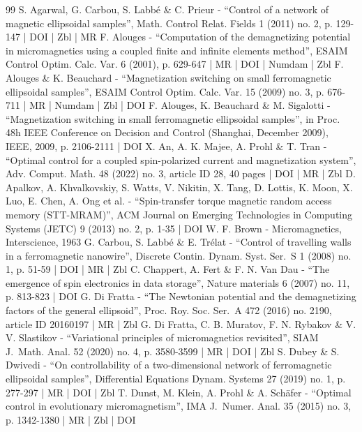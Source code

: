 \begin{thebibliography}{99}
S. Agarwal, G. Carbou, S. Labbé \& C. Prieur - “Control of a network of magnetic ellipsoidal samples”, Math. Control Relat. Fields 1 (2011) no. 2, p. 129-147 | DOI | Zbl | MR
F. Alouges - “Computation of the demagnetizing potential in micromagnetics using a coupled finite and infinite elements method”, ESAIM Control Optim. Calc. Var. 6 (2001), p. 629-647 | MR | DOI | Numdam | Zbl
F. Alouges \& K. Beauchard - “Magnetization switching on small ferromagnetic ellipsoidal samples”, ESAIM Control Optim. Calc. Var. 15 (2009) no. 3, p. 676-711 | MR | Numdam | Zbl | DOI
F. Alouges, K. Beauchard \& M. Sigalotti - “Magnetization switching in small ferromagnetic ellipsoidal samples”, in Proc. 48h IEEE Conference on Decision and Control (Shanghai, December 2009), IEEE, 2009, p. 2106-2111 | DOI
X. An, A. K. Majee, A. Prohl \& T. Tran - “Optimal control for a coupled spin-polarized current and magnetization system”, Adv. Comput. Math. 48 (2022) no. 3, article ID 28, 40 pages | DOI | MR | Zbl
D. Apalkov, A. Khvalkovskiy, S. Watts, V. Nikitin, X. Tang, D. Lottis, K. Moon, X. Luo, E. Chen, A. Ong et al. - “Spin-transfer torque magnetic random access memory (STT-MRAM)”, ACM Journal on Emerging Technologies in Computing Systems (JETC) 9 (2013) no. 2, p. 1-35 | DOI
W. F. Brown - Micromagnetics, Interscience, 1963
G. Carbou, S. Labbé \& E. Trélat - “Control of travelling walls in a ferromagnetic nanowire”, Discrete Contin. Dynam. Syst. Ser. S 1 (2008) no. 1, p. 51-59 | DOI | MR | Zbl
C. Chappert, A. Fert \& F. N. Van Dau - “The emergence of spin electronics in data storage”, Nature materials 6 (2007) no. 11, p. 813-823 | DOI
G. Di Fratta - “The Newtonian potential and the demagnetizing factors of the general ellipsoid”, Proc. Roy. Soc. Ser. A 472 (2016) no. 2190, article ID 20160197 | MR | Zbl
G. Di Fratta, C. B. Muratov, F. N. Rybakov \& V. V. Slastikov - “Variational principles of micromagnetics revisited”, SIAM J. Math. Anal. 52 (2020) no. 4, p. 3580-3599 | MR | DOI | Zbl
S. Dubey \& S. Dwivedi - “On controllability of a two-dimensional network of ferromagnetic ellipsoidal samples”, Differential Equations Dynam. Systems 27 (2019) no. 1, p. 277-297 | MR | DOI | Zbl
T. Dunst, M. Klein, A. Prohl \& A. Schäfer - “Optimal control in evolutionary micromagnetism”, IMA J. Numer. Anal. 35 (2015) no. 3, p. 1342-1380 | MR | Zbl | DOI

\end{thebibliography}
